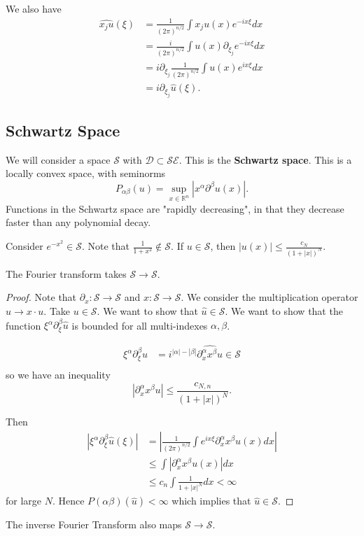 \documentclass[12pt]{scrartcl}
\newcommand{\R}{\mathbb{R}}
\renewcommand{\hat}{\widehat}
\begin{document}
We also have 
\begin{align*}
\hat{x_ju}(\xi) &= \frac{1}{(2\pi)^{n/2}} \int x_j u(x) e^{-ix\xi}dx\\
&= \frac{i}{(2\pi)^{n/2}} \int u(x)\partial_{\xi_j}e^{-ix\xi}dx \\
&= i\partial_{\xi_j} \frac{1}{(2\pi)^{n/2}}\int u(x)e^{ix\xi}dx \\
&= i\partial_{\xi_j} \hat{u}(\xi).
\end{align*}
\subsection{Schwartz Space}
We will consider a space $\mathcal{S}$ with $\mathcal{D} \subset \mathcal S \mathcal E$.  This is the \textbf{Schwartz space}.
This is a locally convex space, with seminorms
$$P_{\alpha\beta}(u) = \sup_{x \in \R^n}|x^{\alpha} \partial^{\beta}u(x)|.$$
Functions in the Schwartz space are "rapidly decreasing", in that they decrease faster than any polynomial decay.
\begin{example} Consider $e^{-x^2} \in \mathcal S$. Note that $\frac{1}{1+x^2} \not \in \mathcal S$.  If $u \in \mathcal S$, then $|u(x)| \le \frac{c_N}{(1 + |x|)^N}$.
\end{example}
\begin{proposition} The Fourier transform takes $\mathcal S \to \mathcal S$.
\end{proposition}
\begin{proof}
Note that $\partial_x: \mathcal S \rightarrow \mathcal S$ and $x: \mathcal S \rightarrow \mathcal S$.  We consider the multiplication operator $u \to x \cdot u$.  Take $u \in \mathcal S$.  We want to show that $\hat{u} \in \mathcal S$.  We want to show that the function $\xi^{\alpha} \partial_{\xi}^{\beta} \hat{u}$ is bounded for all multi-indexes $\alpha, \beta$.

\begin{align*}
\xi^{\alpha} \partial_\xi^{\beta} \hat{u} &= i^{|\alpha| - |\beta|}\hat{\partial_x^{\alpha} x^{\beta} u} \in \mathcal S \\
\end{align*}
so we have an inequality
$$|\partial_x^{\alpha} x^{\beta} u| \le \frac{c_{N, n}}{(1 + |x|)^N}.$$

Then
\begin{align*}
 |\xi^{\alpha}\partial_\xi^{\beta} \hat{u}(\xi)| &= \left|\frac{1}{(2\pi)^{n/2}}\int e^{ix\xi}\partial_x^{\alpha}x^{\beta}u(x)dx\right| \\
 &\le \int |\partial_x^{\alpha}x^{\beta} u(x)|dx \\
 &\le c_n \int \frac{1}{1+|x|^N}dx < \infty
\end{align*}
for large $N$.  Hence $P(\alpha\beta)(\hat{u}) < \infty$ which implies that $\hat{u} \in \mathcal S$.
\end{proof}
\begin{corollary} The inverse Fourier Transform also maps $\mathcal S \to \mathcal S$.
\end{corollary}
\end{document}
